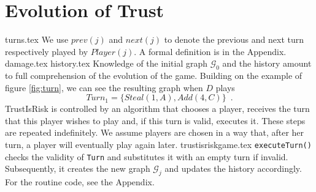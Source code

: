    \section{Evolution of Trust}
     {turns.tex}
     We use $prev\left(j\right)$ and $next\left(j\right)$ to denote the previous and next turn respectively played by
     $Player(j)$. A formal definition is in the Appendix.
     {damage.tex}
     {history.tex}
     Knowledge of the initial graph $\mathcal{G}_0$ and the history amount to full comprehension of the evolution of the
     game. Building on the example of figure \ref{fig:turn}, we can see the resulting graph when $D$ plays
     \begin{equation}
     \label{turnexample}
        Turn_1 = \{Steal\left(1, A\right), Add\left(4, C\right)\} \enspace.
     \end{equation}
     TrustIsRisk is controlled by an algorithm that chooses a player, receives the turn that
     this player wishes to play and, if this turn is valid, executes it. These steps are repeated indefinitely. We assume
     players are chosen in a way that, after her turn, a player will eventually play again later.
     {trustisriskgame.tex}
     \texttt{executeTurn()} checks the validity of \texttt{Turn} and substitutes it with an empty turn if invalid.
     Subsequently, it creates the new graph $\mathcal{G}_j$ and updates the history accordingly. For the routine code,
     see the Appendix.
